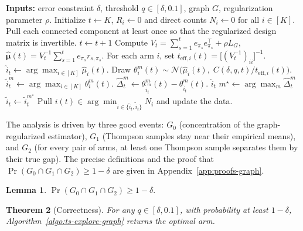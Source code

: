 \documentclass{article}
\newtheorem{theorem}{Theorem}
\newtheorem{lemma}[theorem]{Lemma}
\begin{document}
\begin{algorithm}[t]
\caption{\texttt{TS-Explore} for graph-structured pure exploration}
\label{algo:ts-explore-graph}
\begin{algorithmic}[1]
\State \textbf{Inputs:} error constraint $\delta$, threshold $q\in[\delta,0.1]$, graph $G$, regularization parameter $\rho$.
\State Initialize $t\gets K$, $R_i\gets 0$ and direct counts $N_i\gets 0$ for all $i\in[K]$.
\State Pull each connected component at least once so that the regularized design matrix is invertible.
    \State $t\gets t+1$
    \State Compute $V_t=\sum_{s=1}^t e_{\pi_s}e_{\pi_s}^\top+\rho L_G$, \quad $\widehat{\bm\mu}(t)=V_t^{-1}\sum_{s=1}^t e_{\pi_s}r_{s,\pi_s}$.
    \State For each arm $i$, set $t_{\mathrm{eff},i}(t)=\bigl[(V_t^{-1})_{ii}\bigr]^{-1}$.
    \State $\widehat i_t\gets \arg\max_{i\in[K]}\widehat\mu_i(t)$.
            \State Draw $\theta_i^m(t)\sim \mathcal N\!\bigl(\widehat\mu_i(t),\;C(\delta,q,t)/t_{\mathrm{eff},i}(t)\bigr)$.
        \EndFor
        \State $\widetilde i_t^m\gets \arg\max_{i\in[K]}\theta_i^m(t)$.
        \State $\widehat\Delta_t^m\gets \theta_{\widetilde i_t^m}^m(t)-\theta_{\widehat i_t}^m(t)$.
    \EndFor
        \State \Return $\widehat i_t$
    \Else
        \State $m^\star\gets \arg\max_m \widehat\Delta_t^m$
        \State $\widetilde i_t\gets \widetilde i_t^{m^\star}$
        \State Pull $i(t)\in \arg\min_{i\in\{\widehat i_t,\widetilde i_t\}} N_i$ and update the data.
    \EndIf
\EndWhile
\end{algorithmic}
\end{algorithm}

The analysis is driven by three good events: $G_0$ (concentration of the graph-regularized estimator), $G_1$ (Thompson samples stay near their empirical means), and $G_2$ (for every pair of arms, at least one Thompson sample separates them by their true gap). The precise definitions and the proof that $\Pr(G_0 \cap G_1 \cap G_2) \ge 1 - \delta$ are given in Appendix~\ref{app:proofs-graph}.

\begin{lemma}\label{lem:good-graph}
$\Pr(G_0\cap G_1\cap G_2)\ge 1-\delta.$
\end{lemma}

\begin{theorem}[Correctness]\label{thm:correct-graph}
For any $q\in[\delta,0.1]$, with probability at least $1-\delta$, Algorithm~\ref{algo:ts-explore-graph} returns the optimal arm.
\end{theorem}
\end{document}
